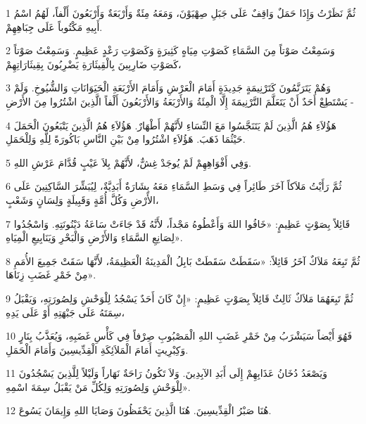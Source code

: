 \par 1 ثُمَّ نَظَرْتُ وَإِذَا حَمَلٌ وَاقِفٌ عَلَى جَبَلِ صِهْيَوْنَ، وَمَعَهُ مِئَةٌ وَأَرْبَعَةٌ وَأَرْبَعُونَ أَلْفاً، لَهُمُ اسْمُ أَبِيهِ مَكْتُوباً عَلَى جِبَاهِهِمْ.
\par 2 وَسَمِعْتُ صَوْتاً مِنَ السَّمَاءِ كَصَوْتِ مِيَاهٍ كَثِيرَةٍ وَكَصَوْتِ رَعْدٍ عَظِيمٍ. وَسَمِعْتُ صَوْتاً كَصَوْتِ ضَارِبِينَ بِالْقِيثَارَةِ يَضْرِبُونَ بِقِيثَارَاتِهِمْ،
\par 3 وَهُمْ يَتَرَنَّمُونَ كَتَرْنِيمَةٍ جَدِيدَةٍ أَمَامَ الْعَرْشِ وَأَمَامَ الأَرْبَعَةِ الْحَيَوَانَاتِ وَالشُّيُوخِ. وَلَمْ يَسْتَطِعْ أَحَدٌ أَنْ يَتَعَلَّمَ التَّرْنِيمَةَ إِلَّا الْمِئَةُ وَالأَرْبَعَةُ وَالأَرْبَعُونَ أَلْفاً الَّذِينَ اشْتُرُوا مِنَ الأَرْضِ -
\par 4 هَؤُلاَءِ هُمُ الَّذِينَ لَمْ يَتَنَجَّسُوا مَعَ النِّسَاءِ لأَنَّهُمْ أَطْهَارٌ. هَؤُلاَءِ هُمُ الَّذِينَ يَتْبَعُونَ الْحَمَلَ حَيْثُمَا ذَهَبَ. هَؤُلاَءِ اشْتُرُوا مِنْ بَيْنِ النَّاسِ بَاكُورَةً لِلَّهِ وَلِلْحَمَلِ.
\par 5 وَفِي أَفْوَاهِهِمْ لَمْ يُوجَدْ غِشٌّ، لأَنَّهُمْ بِلاَ عَيْبٍ قُدَّامَ عَرْشِ اللهِ.
\par 6 ثُمَّ رَأَيْتُ مَلاَكاً آخَرَ طَائِراً فِي وَسَطِ السَّمَاءِ مَعَهُ بِشَارَةٌ أَبَدِيَّةٌ، لِيُبَشِّرَ السَّاكِنِينَ عَلَى الأَرْضِ وَكُلَّ أُمَّةٍ وَقَبِيلَةٍ وَلِسَانٍ وَشَعْبٍ،
\par 7 قَائِلاً بِصَوْتٍ عَظِيمٍ: «خَافُوا اللهَ وَأَعْطُوهُ مَجْداً، لأَنَّهُ قَدْ جَاءَتْ سَاعَةُ دَيْنُونَتِهِ. وَاسْجُدُوا لِصَانِعِ السَّمَاءِ وَالأَرْضِ وَالْبَحْرِ وَيَنَابِيعِ الْمِيَاهِ».
\par 8 ثُمَّ تَبِعَهُ مَلاَكٌ آخَرُ قَائِلاً: «سَقَطَتْ سَقَطَتْ بَابِلُ الْمَدِينَةُ الْعَظِيمَةُ، لأَنَّهَا سَقَتْ جَمِيعَ الأُمَمِ مِنْ خَمْرِ غَضَبِ زِنَاهَا».
\par 9 ثُمَّ تَبِعَهُمَا مَلاَكٌ ثَالِثٌ قَائِلاً بِصَوْتٍ عَظِيمٍ: «إِنْ كَانَ أَحَدٌ يَسْجُدُ لِلْوَحْشِ وَلِصُورَتِهِ، وَيَقْبَلُ سِمَتَهُ عَلَى جَبْهَتِهِ أَوْ عَلَى يَدِهِ،
\par 10 فَهُوَ أَيْضاً سَيَشْرَبُ مِنْ خَمْرِ غَضَبِ اللهِ الْمَصْبُوبِ صِرْفاً فِي كَأْسِ غَضَبِهِ، وَيُعَذَّبُ بِنَارٍ وَكِبْرِيتٍ أَمَامَ الْمَلاَئِكَةِ الْقِدِّيسِينَ وَأَمَامَ الْحَمَلِ.
\par 11 وَيَصْعَدُ دُخَانُ عَذَابِهِمْ إِلَى أَبَدِ الآبِدِينَ. وَلاَ تَكُونُ رَاحَةٌ نَهَاراً وَلَيْلاً لِلَّذِينَ يَسْجُدُونَ لِلْوَحْشِ وَلِصُورَتِهِ وَلِكُلِّ مَنْ يَقْبَلُ سِمَةَ اسْمِهِ».
\par 12 هُنَا صَبْرُ الْقِدِّيسِينَ. هُنَا الَّذِينَ يَحْفَظُونَ وَصَايَا اللهِ وَإِيمَانَ يَسُوعَ.
